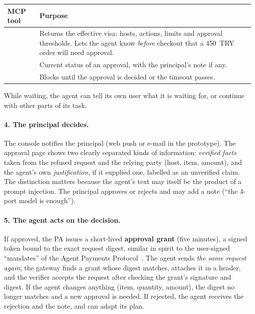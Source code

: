 \begin{center}
\small
\begin{tabularx}{\linewidth}{@{}L{5.4cm}Y@{}}
\toprule
\textbf{MCP tool} & \textbf{Purpose}\\
\midrule
{} & Returns the effective visa: hosts, actions, limits and approval thresholds. Lets the agent know \emph{before} checkout that a 450~TRY order will need approval.\\
 & Current status of an approval, with the principal's note if any.\\
 & Blocks until the approval is decided or the timeout passes.\\
\bottomrule
\end{tabularx}
\end{center}

While waiting, the agent can tell its own user what it is waiting for, or continue with other parts of its task.

\paragraph{4. The principal decides.} The console notifies the principal (web push or e-mail in the prototype). The approval page shows two clearly separated kinds of information: \emph{verified facts} taken from the refused request and the relying party (host, item, amount), and the agent's own \emph{justification}, if it supplied one, labelled as an unverified claim. The distinction matters because the agent's text may itself be the product of a prompt injection. The principal approves or rejects and may add a note (``the 4-port model is enough'').

\paragraph{5. The agent acts on the decision.} If approved, the PA issues a short-lived \textbf{approval grant} (five minutes), a signed token bound to the exact request digest, similar in spirit to the user-signed ``mandates'' of the Agent Payments Protocol~\cite{ap2}. The agent sends \emph{the same request again}; the gateway finds a grant whose digest matches, attaches it in a  header, and the verifier accepts the request after checking the grant's signature and digest. If the agent changes anything (item, quantity, amount), the digest no longer matches and a new approval is needed. If rejected, the agent receives the rejection and the note, and can adapt its plan.

